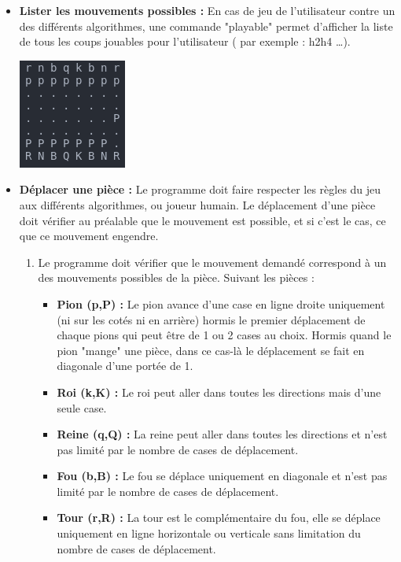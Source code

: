 \documentclass{article}
\begin{document}
\begin{itemize}
    \medskip
    \item \textbf{Lister les mouvements possibles : }
    \newline
    En cas de jeu de l'utilisateur contre un des différents algorithmes, une commande "playable" permet d'afficher la liste de tous les coups jouables pour l'utilisateur ( par exemple : h2h4 \dots).
    \newline
    \centerline{\includegraphics[scale = 0.5]{img/chess_moveh2h4.png}}
    \medskip
    \item \textbf{Déplacer une pièce : }
    \newline
    Le programme doit faire respecter les règles du jeu aux différents algorithmes, ou joueur humain.
    Le déplacement d'une pièce doit vérifier au préalable que le mouvement est possible, et si c'est le cas, ce que ce mouvement engendre.
    \begin{enumerate}
        \item Le programme doit vérifier que le mouvement demandé correspond à un des mouvements possibles de la pièce.
        Suivant les pièces : 
        \begin{itemize}
            \item \textbf{Pion (p,P) : } Le pion avance d'une case en ligne droite uniquement (ni sur les cotés ni en arrière) hormis le premier déplacement de chaque pions qui peut être de 1 ou 2 cases au choix.
            Hormis quand le pion "mange" une pièce, dans ce cas-là le déplacement se fait en diagonale d'une portée de 1.
            \item \textbf{Roi (k,K) : } Le roi peut aller dans toutes les directions mais d'une seule case.
            \item \textbf{Reine (q,Q) : } La reine peut aller dans toutes les directions et n'est pas limité par le nombre de cases de déplacement.
            \item \textbf{Fou (b,B) : } Le fou se déplace uniquement en diagonale et n'est pas limité par le nombre de cases de déplacement.
            \item \textbf{Tour (r,R) : } La tour est le complémentaire du fou, elle se déplace uniquement en ligne horizontale ou verticale sans limitation du nombre de cases de déplacement.

\end{itemize}
\end{enumerate}
\end{itemize}
\end{document}
